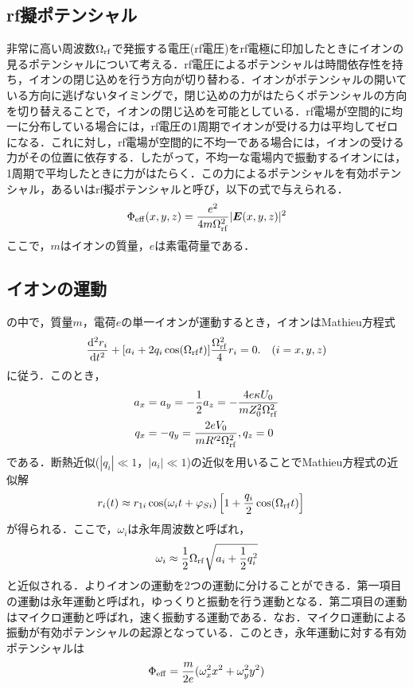 \subsection{rf擬ポテンシャル}
非常に高い周波数$\Omega_{\rm rf}$で発振する電圧(rf電圧)をrf電極に印加したときにイオンの見るポテンシャルについて考える．rf電圧によるポテンシャルは時間依存性を持ち，イオンの閉じ込めを行う方向が切り替わる．イオンがポテンシャルの開いている方向に逃げないタイミングで，閉じ込めの力がはたらくポテンシャルの方向を切り替えることで，イオンの閉じ込めを可能としている．rf電場が空間的に均一に分布している場合には，rf電圧の1周期でイオンが受ける力は平均してゼロになる．これに対し，rf電場が空間的に不均一である場合には，イオンの受ける力がその位置に依存する．したがって，不均一な電場内で振動するイオンには，1周期で平均したときに力がはたらく．この力によるポテンシャルを有効ポテンシャル，あるいはrf擬ポテンシャルと呼び，以下の式で与えられる\cite{URABE}．
\large
\begin{align}\label{eq:eff_pot}
	\Phi_{\rm eff}(x,y,z) = \frac{e^2}{4m\Omega_{\rm rf}^2}|\bm{E}(x,y,z)|^2
\end{align}
\normalsize
ここで，$m$はイオンの質量，$e$は素電荷量である．
\subsection{イオンの運動}
の中で，質量$m$，電荷$e$の単一イオンが運動するとき，イオンはMathieu方程式
\large
\begin{align}
	\frac{{\rm d^2}r_i}{{\rm d}t^2} + [a_i + 2q_i \cos (\Omega_{\rm rf} t)]\frac{\Omega_{\rm rf}^2}{4}r_i = 0. \quad (i = x,y,z)
\end{align}
\normalsize
に従う．このとき，
\large
\begin{align}
a_x &= a_y = -\frac{1}{2}a_z = -\frac{4 e \kappa U_0}{mZ^2_0 \Omega_{\rm rf}^2} \\
q_x &= -q_y = \frac{2eV_0}{mR^{\prime 2}\Omega_{\rm rf}^2},  q_z = 0
\end{align}
\normalsize
である．断熱近似($|q_i| \ll 1$，$|a_i| \ll 1$)の近似を用いることでMathieu方程式の近似解
\large
\begin{align}\label{eq:kinjikai}
r_i(t) &\approx r_{1i}\cos(\omega_i t + \varphi_{Si}) \left[ 1 + \frac{q_i}{2}\cos(\Omega_{\rm rf} t)\right] 
\end{align}
\normalsize
が得られる．ここで，$\omega_i$は永年周波数と呼ばれ，
\large
\begin{align}
\omega_i \approx \frac{1}{2}\Omega_{\rm rf}\sqrt{a_i + \frac{1}{2}q^2_i}
\end{align}
\normalsize
と近似される．よりイオンの運動を2つの運動に分けることができる．第一項目の運動は永年運動と呼ばれ，ゆっくりと振動を行う運動となる．第二項目の運動はマイクロ運動と呼ばれ，速く振動する運動である．なお．マイクロ運動による振動が有効ポテンシャルの起源となっている．このとき，永年運動に対する有効ポテンシャルは
\large
\begin{align}
\Phi_{\rm eff} = \frac{m}{2e}(\omega_x^2 x^2 + \omega_y^2 y^2)
\end{align}
\normalsize

